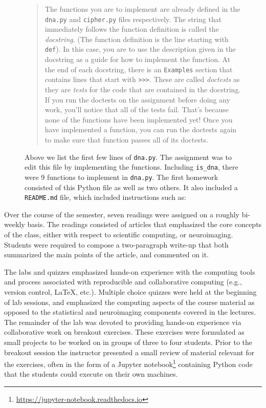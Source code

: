 \begin{figure}
\centering

\caption{Above we list the first few lines of \texttt{dna.py}.
The assignment was to edit this file by implementing the functions.
Including \texttt{is\_dna}, there were 9 functions
to implement in \texttt{dna.py}.
The first homework consisted of this Python file as well as two others.
It also included a \texttt{README.md} file, which included instructions
such as:}\label{fig:dna}
\begin{quotation}
The functions you are to implement are already defined in the \texttt{dna.py} and
\texttt{cipher.py} files respectively. The string that immediately follows the function
definition is called the \emph{docstring}. (The function definition is the line
starting with \texttt{def}). In this case, you are to use the description given in the
docstring as a guide for how to implement the function. At the end of each
docstring, there is an \texttt{Examples} section that contains lines that start with
\verb|>>>|. These are called \emph{doctests} as they are \emph{tests} for the code that are
contained in the docstring. If you run the doctests on the assignment before
doing any work, you'll notice that all of the tests fail. That's because none
of the functions have been implemented yet! Once you have implemented a
function, you can run the doctests again to make sure that function passes all
of its doctests.
\end{quotation}
\end{figure}

Over the course of the semester, seven readings were assigned on a roughly
bi-weekly basis.
The readings consisted of articles that emphasized the core concepts
of the class, either with respect to scientific computing, or neuroimaging.
Students were required to compose a two-paragraph write-up that both summarized
the main points of the article, and commented on it.

The labs and quizzes emphasized hands-on experience with the computing tools
and process associated with reproducible and collaborative computing (e.g.,
version control, \LaTeX, etc.).
Multiple choice quizzes were held at the beginning of lab sessions, and
emphasized the computing aspects of the course material as
opposed to the statistical and neuroimaging components covered in the lectures.
The remainder of the lab was devoted to providing hands-on experience via
collaborative work on breakout exercises.
These exercises were formulated as small projects to be worked on
in groups of three to four students.
Prior to the breakout session the instructor presented a small review of material relevant for the
exercises, often in the form of a Jupyter
notebook\footnote{\url{https://jupyter-notebook.readthedocs.io}} containing
Python code that the students could execute on their own
machines.

